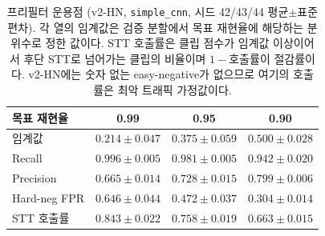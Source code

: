 \documentclass[10pt,twocolumn]{article}
\begin{document}
\begin{table}[!t]
\centering
\caption{프리필터 운용점 (v2-HN, \texttt{simple\_cnn}, 시드 42/43/44 평균$\pm$표준편차). 각 열의
임계값은 검증 분할에서 목표 재현율에 해당하는 분위수로 정한 값이다. STT 호출률은 클립 점수가
임계값 이상이어서 후단 STT로 넘어가는 클립의 비율이며 $1-\text{호출률}$이 절감률이다. v2-HN에는
숫자 없는 easy-negative가 없으므로 여기의 호출률은 최악 트래픽 가정값이다.}
\label{tab:prefilter}
\footnotesize
\setlength{\tabcolsep}{3.5pt}
\begin{tabular}{lccc}
\toprule
목표 재현율 & 0.99 & 0.95 & 0.90 \\
\midrule
임계값        & $0.214\pm0.047$ & $0.375\pm0.059$ & $0.500\pm0.028$ \\
Recall        & $0.996\pm0.005$ & $0.981\pm0.005$ & $0.942\pm0.020$ \\
Precision     & $0.665\pm0.014$ & $0.728\pm0.015$ & $0.799\pm0.006$ \\
Hard-neg FPR  & $0.646\pm0.044$ & $0.472\pm0.037$ & $0.304\pm0.014$ \\
STT 호출률    & $0.843\pm0.022$ & $0.758\pm0.019$ & $0.663\pm0.015$ \\
\bottomrule
\end{tabular}
\end{table}
\end{document}
